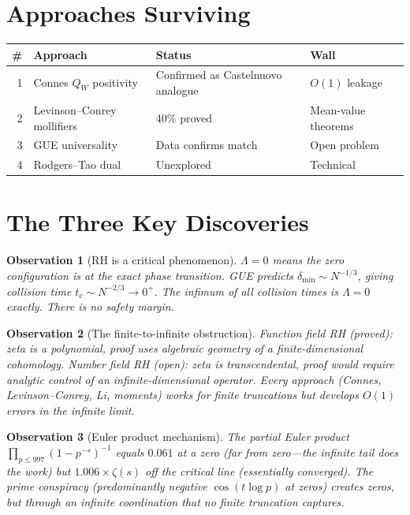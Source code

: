 \documentclass[11pt]{article}
\newtheorem{observation}{Observation}
\begin{document}
\section{Approaches Surviving}
\begin{center}
\begin{tabular}{rp{4cm}p{5cm}l}
\toprule
\# & Approach & Status & Wall \\
\midrule
1 & Connes $Q_W$ positivity & Confirmed as Castelnuovo analogue & $O(1)$ leakage \\
2 & Levinson--Conrey mollifiers & 40\% proved & Mean-value theorems \\
3 & GUE universality & Data confirms match & Open problem \\
4 & Rodgers--Tao dual & Unexplored & Technical \\
\bottomrule
\end{tabular}
\end{center}

\section{The Three Key Discoveries}

\begin{observation}[RH is a critical phenomenon]
$\Lambda = 0$ means the zero configuration is at the exact phase transition. GUE predicts $\delta_{\min} \sim N^{-1/3}$, giving collision time $t_c \sim N^{-2/3} \to 0^+$. The infimum of all collision times is $\Lambda = 0$ exactly. There is no safety margin.
\end{observation}

\begin{observation}[The finite-to-infinite obstruction]
Function field RH (proved): zeta is a polynomial, proof uses algebraic geometry of a finite-dimensional cohomology. Number field RH (open): zeta is transcendental, proof would require analytic control of an infinite-dimensional operator. Every approach (Connes, Levinson--Conrey, Li, moments) works for finite truncations but develops $O(1)$ errors in the infinite limit.
\end{observation}

\begin{observation}[Euler product mechanism]
The partial Euler product $\prod_{p \leq 997}(1-p^{-s})^{-1}$ equals $0.061$ at a zero (far from zero---the infinite tail does the work) but $1.006 \times \zeta(s)$ off the critical line (essentially converged). The prime conspiracy (predominantly negative $\cos(t\log p)$ at zeros) creates zeros, but through an infinite coordination that no finite truncation captures.
\end{observation}
\end{document}
